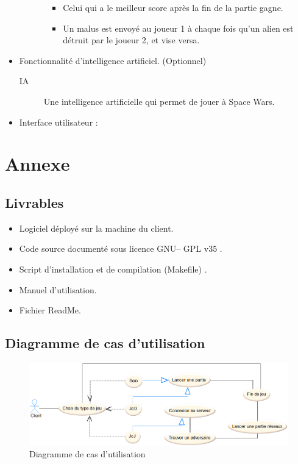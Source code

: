 \documentclass[french, 11pt]{article}
\begin{document}
\begin{itemize}
\begin{itemize}
\begin{itemize}
\begin{itemize}
							\item Celui qui a le meilleur score après la fin de la partie gagne.
							\item Un malus est envoyé au joueur 1 à chaque fois qu'un alien est détruit par le joueur 2, et vise versa.
						\end{itemize}
					\end{itemize}
				\end{itemize}
				\item Fonctionnalité d’intelligence artificiel. (Optionnel)
				\begin{description}
					\item[IA] Une intelligence artificielle qui permet de jouer à Space Wars.
				\end{description}
				\item Interface utilisateur :
			\end{itemize}
			\newpage
			\section{Annexe}
			\subsection{Livrables}
			\begin{itemize}
				\item Logiciel déployé sur la machine du client.
				\item Code source documenté sous licence \og GNU– GPL v35 \fg{}.
				\item Script d’installation et de compilation (Makefile) .
				\item Manuel d’utilisation.
				\item Fichier ReadMe.
			\end{itemize}
			\subsection{Diagramme de cas d'utilisation}
			\begin{figure}[h]
				\centering
				\includegraphics[width=1\linewidth]{DiagrammeDeCasDutilisation2}
				\caption{Diagramme de cas d'utilisation}
			\end{figure}
			\newpage
\end{document}

